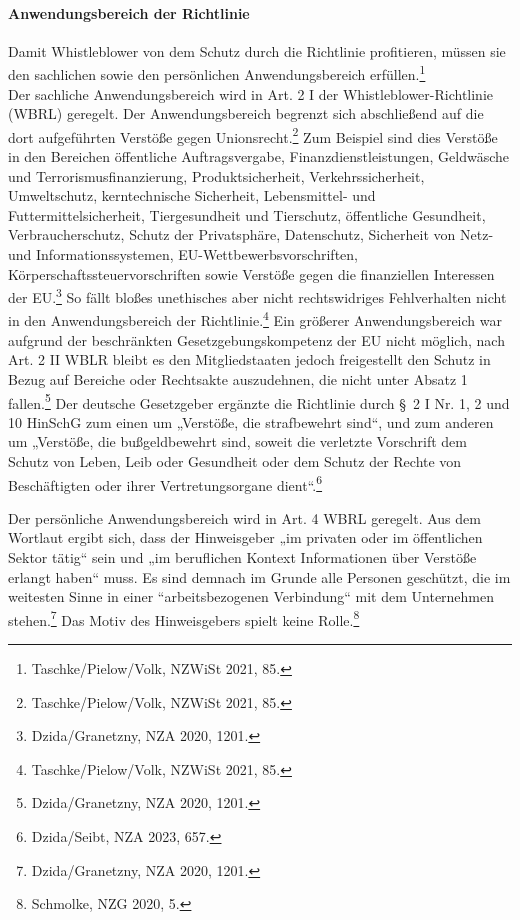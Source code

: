 \paragraph{Anwendungsbereich der Richtlinie}
Damit Whistleblower von dem Schutz durch die Richtlinie profitieren, müssen sie den sachlichen sowie den persönlichen Anwendungsbereich erfüllen.\footnote{Taschke/Pielow/Volk, NZWiSt 2021, 85.}\\
Der sachliche Anwendungsbereich wird in Art. 2 I der Whistleblower-Richtlinie (WBRL) geregelt. 
Der Anwendungsbereich begrenzt sich abschließend auf die dort aufgeführten Verstöße gegen Unionsrecht.\footnote{Taschke/Pielow/Volk, NZWiSt 2021, 85.}
Zum Beispiel sind dies Verstöße in den Bereichen öffentliche Auftragsvergabe, Finanzdienstleistungen, Geldwäsche und Terrorismusfinanzierung, Produktsicherheit, Verkehrssicherheit, Umweltschutz, kerntechnische Sicherheit, Lebensmittel- und Futtermittelsicherheit, Tiergesundheit und Tierschutz, öffentliche Gesundheit, Verbraucherschutz, Schutz der Privatsphäre, Datenschutz, Sicherheit von Netz- und Informationssystemen, EU-Wettbewerbsvorschriften, Körperschaftssteuervorschriften sowie Verstöße gegen die finanziellen Interessen der EU.\footnote{Dzida/Granetzny, NZA 2020, 1201.}
So fällt bloßes unethisches aber nicht rechtswidriges Fehlverhalten nicht in den Anwendungsbereich der Richtlinie.\footnote{Taschke/Pielow/Volk, NZWiSt 2021, 85.}
Ein größerer Anwendungsbereich war aufgrund der beschränkten Gesetzgebungskompetenz der EU nicht möglich, nach Art. 2 II WBLR bleibt es den Mitgliedstaaten jedoch freigestellt den Schutz in Bezug auf Bereiche oder Rechtsakte auszudehnen, die nicht unter Absatz 1 fallen.\footnote{Dzida/Granetzny, NZA 2020, 1201.}
Der deutsche Gesetzgeber ergänzte die Richtlinie durch § 2 I Nr. 1, 2 und 10 HinSchG zum einen um „Verstöße, die strafbewehrt sind“, und zum anderen um „Verstöße, die bußgeldbewehrt sind, soweit die verletzte Vorschrift dem Schutz von Leben, Leib oder Gesundheit oder dem Schutz der Rechte von Beschäftigten oder ihrer Vertretungsorgane dient“.\footnote{Dzida/Seibt, NZA 2023, 657.}

\bigbreak

Der persönliche Anwendungsbereich wird in Art. 4 WBRL geregelt.
Aus dem Wortlaut ergibt sich, dass der Hinweisgeber „im privaten oder im öffentlichen Sektor tätig“ sein und „im beruflichen Kontext Informationen über Verstöße erlangt haben“ muss.
Es sind demnach im Grunde alle Personen geschützt, die im weitesten Sinne in einer “arbeitsbezogenen Verbindung“ mit dem Unternehmen stehen.\footnote{Dzida/Granetzny, NZA 2020, 1201.}
Das Motiv des Hinweisgebers spielt keine Rolle.\footnote{Schmolke, NZG 2020, 5.}


